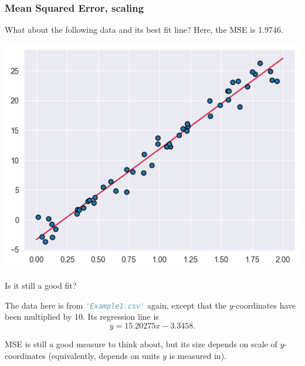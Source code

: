 \documentclass{beamer}
\theoremstyle{example}
\newcommand{\ct}[1]{\lstinline[language=Python,basicstyle=\ttfamily\footnotesize,stringstyle=\small\color{strings}]!#1!}
\begin{document}
\begin{frame}
    \frametitle{Mean Squared Error, scaling}
    What about the following data and its best fit line? Here, the MSE is 1.9746.
    
    \begin{center}
    \includegraphics[height=0.35\textheight]{../../Images/example1-lsr-scaled.png}    
    \end{center}
    
    Is it still a good fit? 

    \pause
    The data here is from \ct{'Example1.csv'} again, except that the $y$-coordinates have been multiplied by 10. Its regression line is 
        \[y = 15.20275x - 3.3458.\]
    
    \pause 
    MSE is still a good measure to think about, but its size depends on scale of $y$-coordinates (equivalently, depends on units $y$ is measured in).

\end{frame}
\end{document}
